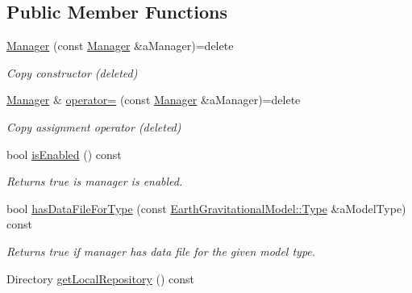 \subsection*{Public Member Functions}
\begin{DoxyCompactItemize}
\item 
\hyperlink{classostk_1_1physics_1_1environment_1_1gravitational_1_1earth_1_1_manager_ac8ea6e08db0342132a14d071bd3f0107}{Manager} (const \hyperlink{classostk_1_1physics_1_1environment_1_1gravitational_1_1earth_1_1_manager}{Manager} \&a\+Manager)=delete
\begin{DoxyCompactList}\small\item\em Copy constructor (deleted) \end{DoxyCompactList}\item 
\hyperlink{classostk_1_1physics_1_1environment_1_1gravitational_1_1earth_1_1_manager}{Manager} \& \hyperlink{classostk_1_1physics_1_1environment_1_1gravitational_1_1earth_1_1_manager_aa95b426416d708cf4f769697d02d7d7d}{operator=} (const \hyperlink{classostk_1_1physics_1_1environment_1_1gravitational_1_1earth_1_1_manager}{Manager} \&a\+Manager)=delete
\begin{DoxyCompactList}\small\item\em Copy assignment operator (deleted) \end{DoxyCompactList}\item 
bool \hyperlink{classostk_1_1physics_1_1environment_1_1gravitational_1_1earth_1_1_manager_a81574e302c483b652a85ae79c73afdd2}{is\+Enabled} () const
\begin{DoxyCompactList}\small\item\em Returns true is manager is enabled. \end{DoxyCompactList}\item 
bool \hyperlink{classostk_1_1physics_1_1environment_1_1gravitational_1_1earth_1_1_manager_a90e787fb914d34c7739ddd650bef471f}{has\+Data\+File\+For\+Type} (const \hyperlink{classostk_1_1physics_1_1environment_1_1gravitational_1_1_earth_a9895df78b5c5aab5e981bf765f8c0f05}{Earth\+Gravitational\+Model\+::\+Type} \&a\+Model\+Type) const
\begin{DoxyCompactList}\small\item\em Returns true if manager has data file for the given model type. \end{DoxyCompactList}\item 
Directory \hyperlink{classostk_1_1physics_1_1environment_1_1gravitational_1_1earth_1_1_manager_aec5c97d1dc02e1f019c3a77f827d7da7}{get\+Local\+Repository} () const

\end{DoxyCompactItemize}
